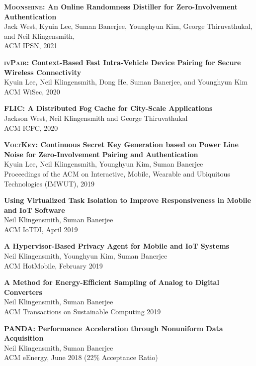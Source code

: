 \documentclass{res}
\begin{document}
\begin{resume}
\begin{etaremune}[leftmargin=0cm,topsep=0pt,itemsep=0pt,partopsep=0pt,parsep=0pt,]
\item
    {\bf \textsc{Moonshine}: An Online Randomness Distiller for Zero-Involvement Authentication} \\
    Jack West, Kyuin Lee, Suman Banerjee, Younghyun Kim, George Thiruvathukal, and Neil Klingensmith, \\
    ACM IPSN, 2021


\item
    {\bf \textsc{ivPair}: Context-Based Fast Intra-Vehicle Device Pairing for Secure Wireless Connectivity} \\
    Kyuin Lee, Neil Klingensmith, Dong He, Suman  Banerjee, and Younghyun Kim \\
    ACM WiSec, 2020


\item
    {\bf FLIC: A Distributed Fog Cache for City-Scale Applications} \\
    Jackson West, Neil Klingensmith and George Thiruvathukal \\
    ACM ICFC, 2020

\item
    {\bf \textsc{VoltKey}: Continuous Secret Key Generation based on Power Line Noise for Zero-Involvement Pairing and Authentication} \\
    Kyuin Lee, Neil Klingensmith, Younghyun Kim, Suman Banerjee \\
    Proceedings of the ACM on Interactive, Mobile, Wearable and Ubiquitous Technologies (IMWUT), 2019

\item
    {\bf Using Virtualized Task Isolation to Improve Responsiveness in Mobile and IoT Software} \\
    Neil Klingensmith, Suman Banerjee \\
    ACM IoTDI, April 2019

\item
    {\bf A Hypervisor-Based Privacy Agent for Mobile and IoT Systems} \\
    Neil Klingensmith, Younghyun Kim, Suman Banerjee \\
    ACM HotMobile, February 2019


\item
    {\bf A Method for Energy-Efficient Sampling of Analog to Digital Converters} \\
    Neil Klingensmith, Suman Banerjee \\
    ACM Transactions on Sustainable Computing 2019

\item
    {\bf PANDA: Performance Acceleration through Nonuniform Data Acquisition} \\
    Neil Klingensmith, Suman Banerjee \\
    ACM eEnergy, June 2018 (22\% Acceptance Ratio)


\end{etaremune}
\end{resume}
\end{document}
